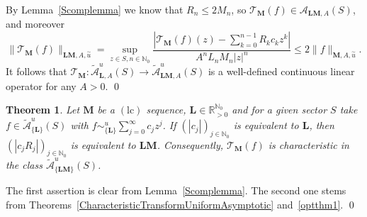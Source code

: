 \documentclass[11pt,a4paper]{article}
\theoremstyle{plain}
\newtheorem{theorem}[proposition]{Theorem}
\theoremstyle{definition}
\newcommand{\RR}{\mathbb{R}}
\newcommand{\NN}{\mathbb{N}}
\newcommand{\M}{\mathbf{M}}
\newcommand{\LL}{\mathbf{L}}
\begin{document}
By Lemma~\ref{Scomplemma} we know that $R_n\le 2M_n$, so $\mathcal{T}_{\M} (f)\in \mathcal{A}_{\LL\M, A} (S)$, and moreover
$$\|\mathcal{T}_{\M} (f)\|_{\LL\M, A,\overset{\sim}{u}}=\sup_{z\in S,n\in\NN_{0}}\frac{|\mathcal{T}_{\M} (f) (z) -  \sum_{k=0}^{n-1} R_kc_k z^k|}{A^{n}L_{n}M_{n}|z|^n}\le 2\|f\|_{\M,A,\overset{\sim}{u}}.$$
It follows that $\mathcal{T}_{\M} : \widetilde{\mathcal{A}}^u_{\LL, A} (S)\rightarrow\widetilde{\mathcal{A}}^u_{\LL\M, A } (S) $ is a well-defined continuous linear operator for any $A>0$.
\qed\enddemo

\begin{theorem}\label{CharacteristicTransformUniformAsymptotic1}
 Let $\M$ be a \hyperlink{lc}{$(\text{lc})$} sequence, $\LL\in\RR_{>0}^{\NN_0}$ and for a given sector $S$ take $f\in \widetilde{\mathcal{A}}^u_{\{\LL\}} (S)$  with $f\sim^u_{\{\LL\}}\sum_{j=0}^{\infty}c_j z^j$. If $(|c_j|)_{j\in\NN_0}$ is equivalent to $\LL$, then $(|c_j R_j|)_{j\in\NN_0}$ is
 equivalent to $\LL\M$. Consequently, $\mathcal{T}_{\M}(f)$ is characteristic in the class $\widetilde{\mathcal{A}}^u_{\{\LL\M\}} (S)$.
\end{theorem}

The first assertion is clear from Lemma~\ref{Scomplemma}. The second one stems from Theorems~\ref{CharacteristicTransformUniformAsymptotic} and~\ref{optthm1}.
\qed\enddemo

\end{document}

